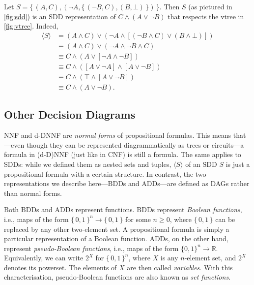 \begin{example}
  Let $S = \{\, (A, C), (\neg A, \{\, (\neg B, C), (B, \bot) \,\}) \,\}$. Then
  $S$ (as pictured in \cref{fig:sdd}) is an SDD representation of
  $C \land (A \lor \neg B)$ that respects the vtree in \cref{fig:vtree}. Indeed,
  \begin{align*}
    \langle S \rangle &= (A \land C) \lor (\neg A \land [(\neg B \land C) \lor (B \land \bot)]) \\
    &\equiv (A \land C) \lor (\neg A \land \neg B \land C) \\
    &\equiv C \land (A \lor [\neg A \land \neg B]) \\
    &\equiv C \land ([A \lor \neg A] \land [A \lor \neg B]) \\
    &\equiv C \land (\top \land [A \lor \neg B]) \\
    &\equiv C \land (A \lor \neg B).
  \end{align*}
\end{example}

\subsection{Other Decision Diagrams}\label{sec:dds}

NNF and d-DNNF are \emph{normal forms} of propositional formulas. This means
that---even though they can be represented diagrammatically as trees or
circuits---a formula in (d-D)NNF (just like in CNF) is still a formula. The same
applies to SDDs: while we defined them as nested sets and tuples,
$\langle S \rangle$ of an SDD $S$ is just a propositional formula with a certain
structure. In contrast, the two representations we describe here---BDDs and
ADDs---are defined as DAGs rather than normal forms.

Both BDDs and ADDs represent functions. BDDs represent \emph{Boolean functions},
i.e., maps of the form ${\{\, 0, 1 \,\}}^n \to \{\, 0, 1 \,\}$ for some
$n \ge 0$, where $\{\, 0, 1 \,\}$ can be replaced by any other two-element set.
A propositional formula is simply a particular representation of a Boolean
function. ADDs, on the other hand, represent \emph{pseudo-Boolean functions},
i.e., maps of the form ${\{ 0, 1 \}}^n \to \mathbb{R}$. Equivalently, we can
write $2^X$ for ${\{\, 0, 1 \,\}}^n$, where $X$ is any $n$-element set, and
$2^X$ denotes its powerset. The elements of $X$ are then called
\emph{variables}. With this characterisation, pseudo-Boolean functions are also
known as \emph{set functions}.


